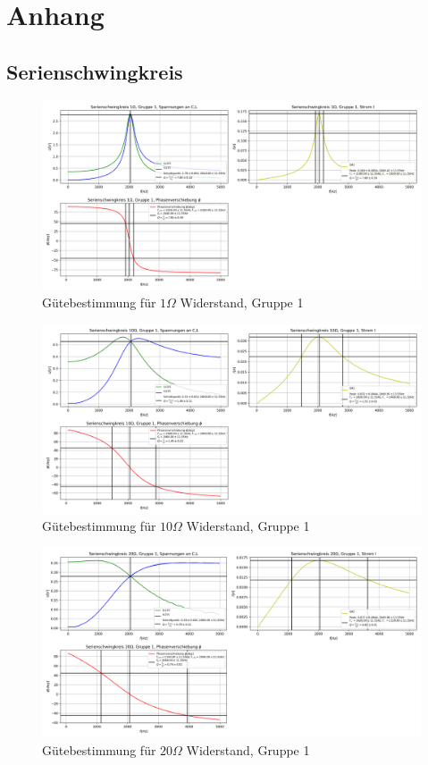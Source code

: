 \documentclass[a4paper, 11pt]{article}
\begin{document}
\newpage
\section{Anhang}
\subsection{Serienschwingkreis}
\begin{figure}[H]
	\hskip-2cm
	\includegraphics[trim = 0mm 0mm 0mm 0mm,clip, width=20cm]{Bilder/SerieSK1Ohm.png}%
	\caption[Gütebestimmung für $1 \Omega$ Widerstand, Gruppe 1]{Gütebestimmung für $1 \Omega$ Widerstand, Gruppe 1}%
	\label{pic:Abbildung 3}%
\end{figure}
\begin{figure}[H]
	\hskip-2cm
	\includegraphics[trim = 0mm 0mm 0mm 0mm,clip, width=20cm]{Bilder/SerieSK10Ohm.png}%
	\caption[Gütebestimmung für $10 \Omega$ Widerstand, Gruppe 1]{Gütebestimmung für $10 \Omega$ Widerstand, Gruppe 1}%
	\label{pic:Abbildung 3}%
\end{figure}
\begin{figure}[H]
	\hskip-2cm
	\includegraphics[trim = 0mm 0mm 0mm 0mm,clip, width=20cm]{Bilder/SerieSK20Ohm.png}%
	\caption[Gütebestimmung für $20 \Omega$ Widerstand, Gruppe 1]{Gütebestimmung für $20 \Omega$ Widerstand, Gruppe 1}%
	\label{pic:Abbildung 3}%
\end{figure}
\end{document}
